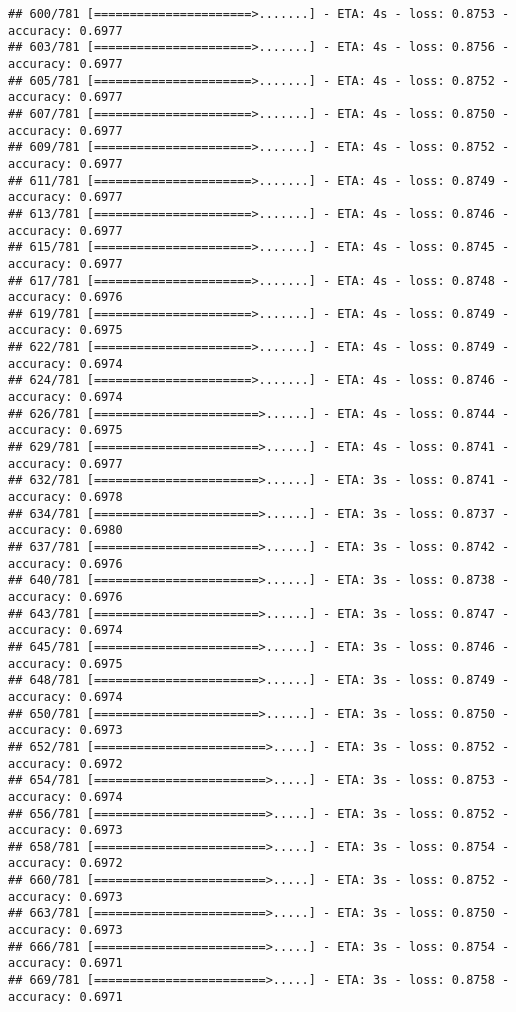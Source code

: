 \documentclass[
]{article}
\begin{document}
\begin{verbatim}
## 600/781 [======================>.......] - ETA: 4s - loss: 0.8753 - accuracy: 0.6977
## 603/781 [======================>.......] - ETA: 4s - loss: 0.8756 - accuracy: 0.6977
## 605/781 [======================>.......] - ETA: 4s - loss: 0.8752 - accuracy: 0.6977
## 607/781 [======================>.......] - ETA: 4s - loss: 0.8750 - accuracy: 0.6977
## 609/781 [======================>.......] - ETA: 4s - loss: 0.8752 - accuracy: 0.6977
## 611/781 [======================>.......] - ETA: 4s - loss: 0.8749 - accuracy: 0.6977
## 613/781 [======================>.......] - ETA: 4s - loss: 0.8746 - accuracy: 0.6977
## 615/781 [======================>.......] - ETA: 4s - loss: 0.8745 - accuracy: 0.6977
## 617/781 [======================>.......] - ETA: 4s - loss: 0.8748 - accuracy: 0.6976
## 619/781 [======================>.......] - ETA: 4s - loss: 0.8749 - accuracy: 0.6975
## 622/781 [======================>.......] - ETA: 4s - loss: 0.8749 - accuracy: 0.6974
## 624/781 [======================>.......] - ETA: 4s - loss: 0.8746 - accuracy: 0.6974
## 626/781 [=======================>......] - ETA: 4s - loss: 0.8744 - accuracy: 0.6975
## 629/781 [=======================>......] - ETA: 4s - loss: 0.8741 - accuracy: 0.6977
## 632/781 [=======================>......] - ETA: 3s - loss: 0.8741 - accuracy: 0.6978
## 634/781 [=======================>......] - ETA: 3s - loss: 0.8737 - accuracy: 0.6980
## 637/781 [=======================>......] - ETA: 3s - loss: 0.8742 - accuracy: 0.6976
## 640/781 [=======================>......] - ETA: 3s - loss: 0.8738 - accuracy: 0.6976
## 643/781 [=======================>......] - ETA: 3s - loss: 0.8747 - accuracy: 0.6974
## 645/781 [=======================>......] - ETA: 3s - loss: 0.8746 - accuracy: 0.6975
## 648/781 [=======================>......] - ETA: 3s - loss: 0.8749 - accuracy: 0.6974
## 650/781 [=======================>......] - ETA: 3s - loss: 0.8750 - accuracy: 0.6973
## 652/781 [========================>.....] - ETA: 3s - loss: 0.8752 - accuracy: 0.6972
## 654/781 [========================>.....] - ETA: 3s - loss: 0.8753 - accuracy: 0.6974
## 656/781 [========================>.....] - ETA: 3s - loss: 0.8752 - accuracy: 0.6973
## 658/781 [========================>.....] - ETA: 3s - loss: 0.8754 - accuracy: 0.6972
## 660/781 [========================>.....] - ETA: 3s - loss: 0.8752 - accuracy: 0.6973
## 663/781 [========================>.....] - ETA: 3s - loss: 0.8750 - accuracy: 0.6973
## 666/781 [========================>.....] - ETA: 3s - loss: 0.8754 - accuracy: 0.6971
## 669/781 [========================>.....] - ETA: 3s - loss: 0.8758 - accuracy: 0.6971

\end{verbatim}
\end{document}
